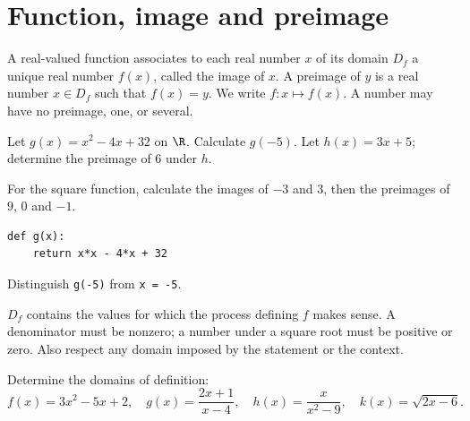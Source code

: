 \section{Function, image and preimage}
\begin{keypoint}[Definition]
A real-valued function associates to each real number $x$ of its domain $D_f$ a unique real number $f(x)$, called the image of $x$. A preimage of $y$ is a real number $x\in D_f$ such that $f(x)=y$. We write $f:x\mapsto f(x)$. A number may have no preimage, one, or several.
\end{keypoint}
\begin{example}Let $g(x)=x^2-4x+32$ on $\R$. Calculate $g(-5)$. Let $h(x)=3x+5$; determine the preimage of $6$ under $h$.\end{example}
\begin{example}For the square function, calculate the images of $-3$ and $3$, then the preimages of $9$, $0$ and $-1$.\end{example}
\begin{lstlisting}
def g(x):
    return x*x - 4*x + 32
\end{lstlisting}
\begin{example}Distinguish \texttt{g(-5)} from \texttt{x = -5}.\end{example}
\begin{keypoint}
$D_f$ contains the values for which the process defining $f$ makes sense. A denominator must be nonzero; a number under a square root must be positive or zero. Also respect any domain imposed by the statement or the context.
\end{keypoint}
\begin{example}Determine the domains of definition:
\[f(x)=3x^2-5x+2,\quad g(x)=\frac{2x+1}{x-4},\quad h(x)=\frac{x}{x^2-9},\quad k(x)=\sqrt{2x-6}.\]\end{example}
